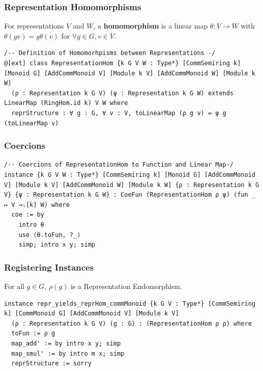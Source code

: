 \documentclass{beamer}
\begin{document}

\begin{frame}[fragile]
\frametitle{Representation Homomorphisms}
\begin{definition}
For representations \(V\) and \(W\), a \textbf{homomorphism} is a linear map \(\theta: V\to W\) with \(\theta(gv) = g\theta(v)\) for \(\forall g\in G, v\in V\).
\end{definition}
\begin{lstlisting}
/-- Definition of Homomorhpisms between Representations -/
@[ext] class RepresentationHom {k G V W : Type*} [CommSemiring k] [Monoid G] [AddCommMonoid V] [Module k V] [AddCommMonoid W] [Module k W]
  (ρ : Representation k G V) (ψ : Representation k G W) extends LinearMap (RingHom.id k) V W where
  reprStructure : ∀ g : G, ∀ v : V, toLinearMap (ρ g v) = ψ g (toLinearMap v)
\end{lstlisting}
\end{frame}


\begin{frame}[fragile]
\frametitle{Coercions}
\begin{lstlisting}
/-- Coercions of RepresentationHom to Function and Linear Map-/
instance {k G V W : Type*} [CommSemiring k] [Monoid G] [AddCommMonoid V] [Module k V] [AddCommMonoid W] [Module k W] {ρ : Representation k G V} {ψ : Representation k G W} : CoeFun (RepresentationHom ρ ψ) (fun _ ↦ V →ₗ[k] W) where
  coe := by
    intro θ
    use ⟨θ.toFun, ?_⟩
    simp; intro x y; simp
\end{lstlisting}
\end{frame}


\begin{frame}[fragile]
\frametitle{Registering Instances}
\begin{lemma}
For all \(g \in G\), \(\rho(g)\) is a Representation Endomorphism.
\end{lemma}
\begin{lstlisting}
instance repr_yields_reprHom_commMonoid {k G V : Type*} [CommSemiring k] [CommMonoid G] [AddCommMonoid V] [Module k V]
  (ρ : Representation k G V) (g : G) : (RepresentationHom ρ ρ) where
  toFun := ρ g
  map_add' := by intro x y; simp
  map_smul' := by intro m x; simp
  reprStructure := sorry
\end{lstlisting}
\end{frame}
\end{document}
